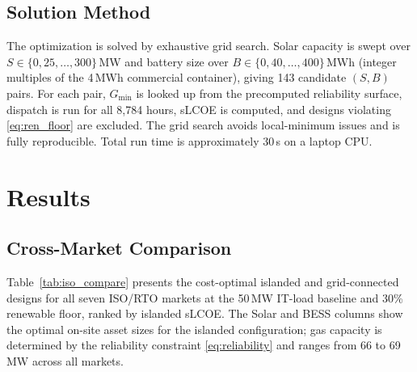 \documentclass[conference]{IEEEtran}
\begin{document}
\subsection{Solution Method}

The optimization is solved by exhaustive grid search.
Solar capacity is swept over $S \in \{0,25,\ldots,300\}$\,MW and battery
size over $B \in \{0,40,\ldots,400\}$\,MWh (integer multiples of the 4\,MWh
commercial container), giving 143 candidate $(S,B)$ pairs.
For each pair, $G_{\min}$ is looked up from the precomputed reliability
surface, dispatch is run for all 8,784 hours, sLCOE is computed, and designs
violating \eqref{eq:ren_floor} are excluded.
The grid search avoids local-minimum issues and is fully reproducible.
Total run time is approximately 30\,s on a laptop CPU.

\section{Results}
\label{sec:results}

\subsection{Cross-Market Comparison}

Table~\ref{tab:iso_compare} presents the cost-optimal islanded and
grid-connected designs for all seven ISO/RTO markets at the 50\,MW IT-load
baseline and 30\% renewable floor, ranked by islanded sLCOE.
The Solar and BESS columns show the optimal on-site asset sizes for the
islanded configuration; gas capacity is determined by the reliability
constraint \eqref{eq:reliability} and ranges from 66 to 69\,MW across all
markets.
\end{document}
